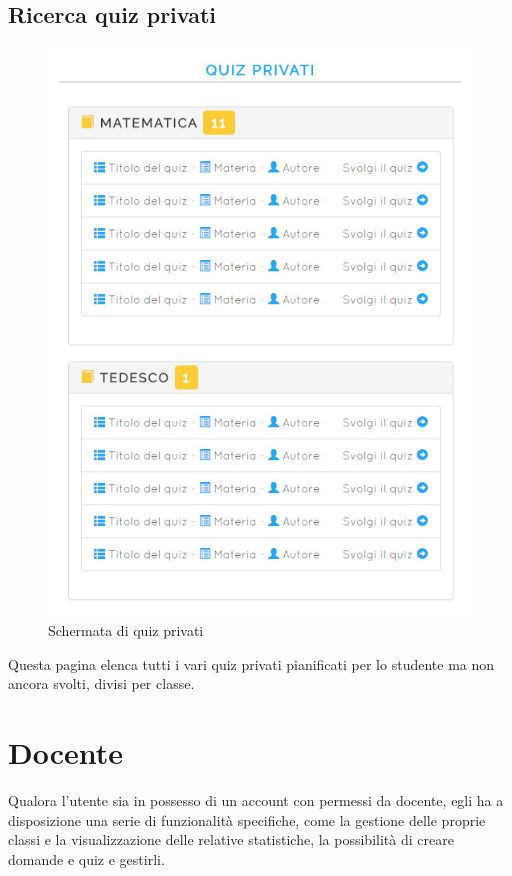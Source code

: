 \documentclass[a4paper, titlepage]{article}
\begin{document}
	 \subsection{Ricerca quiz privati}
	 \begin{figure}[!h]
	 	\centering
	 	\includegraphics[scale=0.33]{Img/screen_ListaQuizPrivati.png}
	 	\caption{Schermata di quiz privati}
	 \end{figure}
	 Questa pagina elenca tutti i vari quiz privati pianificati per lo studente ma non ancora svolti, divisi per classe.
	 
	 
	 \newpage
	 \section{Docente}
	 Qualora l'utente sia in possesso di un account con permessi da docente, egli ha a disposizione una serie di funzionalità specifiche, come la gestione delle proprie classi e la visualizzazione delle relative statistiche, la possibilità di creare domande e quiz e gestirli.
	 
\end{document}
